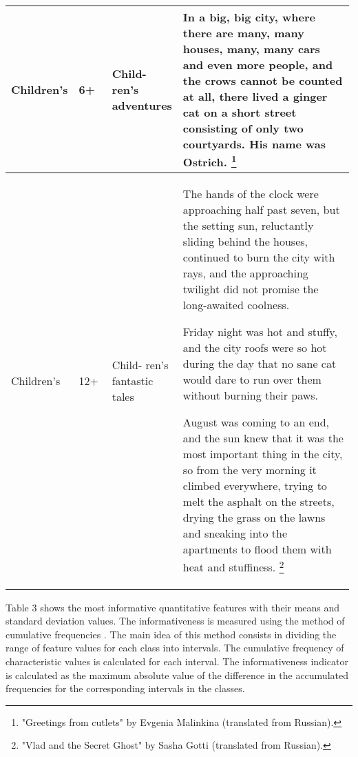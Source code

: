 \documentclass[runningheads]{llncs}
\begin{document}
\begin{longtable}{|p{0.15\linewidth}|p{0.1\linewidth}|p{0.1\linewidth}|p{0.64\linewidth}|}
Children's & 6+ &  Child- ren's adventures & In a big, big city, where there are many, many houses, many, many cars and even more people, and the crows cannot be counted at all, there lived a ginger cat on a short street consisting of only two courtyards. His name was Ostrich. \footnote{"Greetings from cutlets" by Evgenia Malinkina (translated from Russian).}\\ \hline
Children's &  12+ & Child- ren's fantastic tales &  The hands of the clock were approaching half past seven, but the setting sun, reluctantly sliding behind the houses, continued to burn the city with rays, and the approaching twilight did not promise the long-awaited coolness.

Friday night was hot and stuffy, and the city roofs were so hot during the day that no sane cat would dare to run over them without burning their paws.

August was coming to an end, and the sun knew that it was the most important thing in the city, so from the very morning it climbed everywhere, trying to melt the asphalt on the streets, drying the grass on the lawns and sneaking into the apartments to flood them with heat and stuffiness. \footnote{"Vlad and the Secret Ghost" by Sasha Gotti (translated from Russian).}\\ \hline
\end{longtable}

Table 3 shows the most informative quantitative features with their means and standard deviation values. The informativeness is measured using the method of cumulative frequencies \cite{Aivazyan,Zagoruiko}. The main idea of this method consists in dividing the range of feature values for each class into  intervals. The cumulative frequency of characteristic values is calculated for each interval. The informativeness indicator is calculated as the maximum absolute value of the difference in the accumulated frequencies for the corresponding intervals in the classes.
\end{document}

